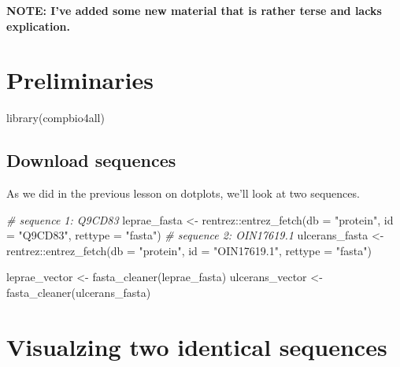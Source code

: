 \documentclass[
]{book}
\newenvironment{Shaded}{\begin{snugshade}}{\end{snugshade}}
\newcommand{\AttributeTok}[1]{\textcolor[rgb]{0.77,0.63,0.00}{#1}}
\newcommand{\CommentTok}[1]{\textcolor[rgb]{0.56,0.35,0.01}{\textit{#1}}}
\newcommand{\FunctionTok}[1]{\textcolor[rgb]{0.00,0.00,0.00}{#1}}
\newcommand{\NormalTok}[1]{#1}
\newcommand{\OtherTok}[1]{\textcolor[rgb]{0.56,0.35,0.01}{#1}}
\newcommand{\SpecialCharTok}[1]{\textcolor[rgb]{0.00,0.00,0.00}{#1}}
\newcommand{\StringTok}[1]{\textcolor[rgb]{0.31,0.60,0.02}{#1}}
\begin{document}
\textbf{NOTE: I've added some new material that is rather terse and lacks explication.}

\hypertarget{preliminaries-5}{%
\section{Preliminaries}\label{preliminaries-5}}

\begin{Shaded}
\begin{Highlighting}[]
\FunctionTok{library}\NormalTok{(compbio4all)}
\end{Highlighting}
\end{Shaded}

\hypertarget{download-sequences-1}{%
\subsection{Download sequences}\label{download-sequences-1}}

As we did in the previous lesson on dotplots, we'll look at two sequences.

\begin{Shaded}
\begin{Highlighting}[]
\CommentTok{\# sequence 1: Q9CD83}
\NormalTok{leprae\_fasta }\OtherTok{\textless{}{-}}\NormalTok{ rentrez}\SpecialCharTok{::}\FunctionTok{entrez\_fetch}\NormalTok{(}\AttributeTok{db =} \StringTok{"protein"}\NormalTok{,}
                        \AttributeTok{id =} \StringTok{"Q9CD83"}\NormalTok{,}
                         \AttributeTok{rettype =} \StringTok{"fasta"}\NormalTok{)}
\CommentTok{\# sequence 2: OIN17619.1}
\NormalTok{ulcerans\_fasta }\OtherTok{\textless{}{-}}\NormalTok{ rentrez}\SpecialCharTok{::}\FunctionTok{entrez\_fetch}\NormalTok{(}\AttributeTok{db =} \StringTok{"protein"}\NormalTok{,}
                         \AttributeTok{id =} \StringTok{"OIN17619.1"}\NormalTok{,}
                         \AttributeTok{rettype =} \StringTok{"fasta"}\NormalTok{)}

\NormalTok{leprae\_vector   }\OtherTok{\textless{}{-}} \FunctionTok{fasta\_cleaner}\NormalTok{(leprae\_fasta)}
\NormalTok{ulcerans\_vector }\OtherTok{\textless{}{-}} \FunctionTok{fasta\_cleaner}\NormalTok{(ulcerans\_fasta)}
\end{Highlighting}
\end{Shaded}

\hypertarget{visualzing-two-identical-sequences}{%
\section{Visualzing two identical sequences}\label{visualzing-two-identical-sequences}}
\end{document}
